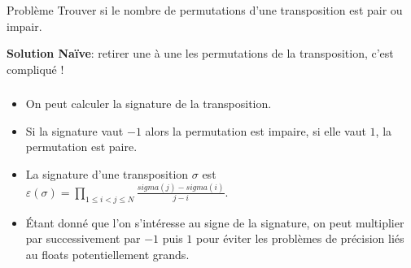 \begin{frame}
    \frametitle{\problemtitle}
        \begin{block}
            {Problème} Trouver si le nombre de permutations d'une transposition est pair ou impair.
        \end{block}
        \pause
        \textbf{Solution Naïve}: retirer une à une les permutations de la transposition, c'est compliqué !
\end{frame}

\begin{frame}
    \frametitle{\problemtitle}
    \begin{itemize}
        \item<+-> On peut calculer la signature de la transposition.
        \item<+-> Si la signature vaut $-1$ alors la permutation est impaire, si elle vaut $1$, la permutation est paire.
        \item<+-> La signature d'une transposition $\sigma$ est $\varepsilon(\sigma) = \prod_{1\leq i < j \leq N} \frac{sigma(j)-sigma(i)}{j-i}$.
        \item<+-> Étant donné que l'on s'intéresse au signe de la signature, on peut multiplier par successivement par $-1$  puis $1$ pour éviter les problèmes de précision liés au floats potentiellement grands.
    \end{itemize}
\end{frame}
